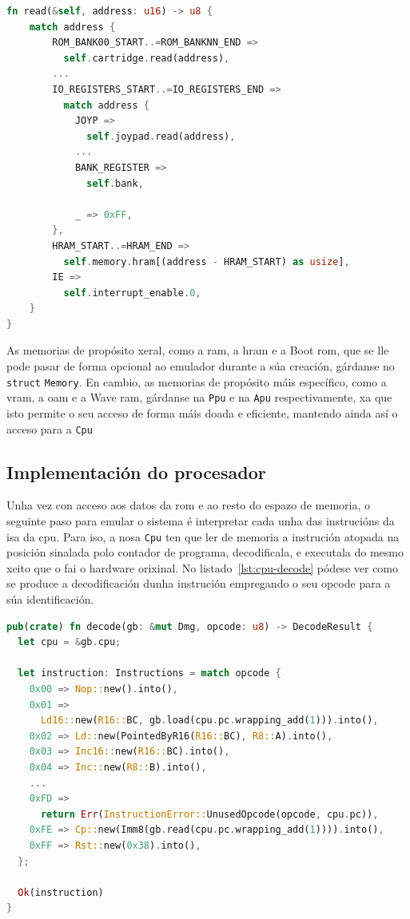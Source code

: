 \begin{lstlisting}[language=Rust, float=tbp, caption={Implementación da función \textit{read} por \texttt{Dmg}}, label={lst:dmg-read}]
fn read(&self, address: u16) -> u8 {
    match address {
        ROM_BANK00_START..=ROM_BANKNN_END =>
          self.cartridge.read(address),
        ...
        IO_REGISTERS_START..=IO_REGISTERS_END =>
          match address {
            JOYP =>
              self.joypad.read(address),
            ...
            BANK_REGISTER =>
              self.bank,

            _ => 0xFF,
        },
        HRAM_START..=HRAM_END =>
          self.memory.hram[(address - HRAM_START) as usize],
        IE =>
          self.interrupt_enable.0,
    }
}
\end{lstlisting}

As memorias de propósito xeral, como a \acrshort{ram}, a \acrshort{hram} e a Boot \acrshort{rom}, que se lle pode pasar de forma opcional ao emulador durante a súa creación,
gárdanse no \texttt{struct} \texttt{Memory}. En cambio, as memorias de propósito máis específico, como a \acrshort{vram}, a \acrshort{oam} e a Wave \acrshort{ram},
gárdanse na \texttt{Ppu} e na \texttt{Apu} respectivamente, xa que isto permite o seu acceso de forma máis doada e eficiente, mantendo ainda así o acceso para a \texttt{Cpu}


\subsection{Implementación do procesador}

Unha vez con acceso aos datos da \acrshort{rom} e ao resto do espazo de memoria,
o seguinte paso para emular o sistema é interpretar cada unha das instrucións da \acrshort{isa} da \acrshort{cpu}. 
Para iso, a nosa \texttt{Cpu} ten que ler de memoria a instrución atopada na posición sinalada polo contador de programa,
decodificala, e executala do mesmo xeito que o fai o hardware orixinal.
No listado~\ref{lst:cpu-decode} pódese ver como se produce a decodificación dunha instrución empregando o seu \gls{opcode} para a súa identificación.

\begin{lstlisting}[language=Rust, float=tbp, caption={Función \textit{decode} de \texttt{Cpu}}, label={lst:cpu-decode}]
pub(crate) fn decode(gb: &mut Dmg, opcode: u8) -> DecodeResult {
  let cpu = &gb.cpu;

  let instruction: Instructions = match opcode {
    0x00 => Nop::new().into(),
    0x01 =>
      Ld16::new(R16::BC, gb.load(cpu.pc.wrapping_add(1))).into(),
    0x02 => Ld::new(PointedByR16(R16::BC), R8::A).into(),
    0x03 => Inc16::new(R16::BC).into(),
    0x04 => Inc::new(R8::B).into(),
    ...
    0xFD =>
      return Err(InstructionError::UnusedOpcode(opcode, cpu.pc)),
    0xFE => Cp::new(Imm8(gb.read(cpu.pc.wrapping_add(1)))).into(),
    0xFF => Rst::new(0x38).into(),
  };

  Ok(instruction)
}
\end{lstlisting}

